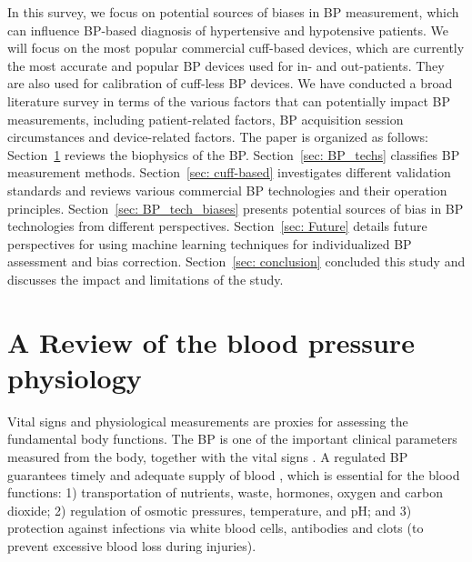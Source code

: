 \documentclass[journal,article,moreauthors]{Definitions/mdpi}
\begin{document}
In this survey, we focus on potential sources of biases in BP measurement, which can influence BP-based diagnosis of hypertensive and hypotensive patients. %
We will focus on the most popular commercial cuff-based devices, which are currently the most accurate and popular BP devices used for in- and out-patients. They are also used for calibration of cuff-less BP devices. We have conducted a broad literature survey in terms of the various factors that can potentially impact BP measurements, including patient-related factors, BP acquisition session circumstances and device-related factors. The paper is organized as follows: Section~\ref{sec: BP_review} reviews the biophysics of the BP. Section~\ref{sec: BP_techs} classifies BP measurement methods. Section~\ref{sec: cuff-based} investigates different validation standards and reviews various commercial BP technologies and their operation principles. 
Section~\ref{sec: BP_tech_biases} presents potential sources of bias in BP technologies from different perspectives. Section~\ref{sec: Future} details future perspectives for using machine learning techniques for individualized BP assessment and bias correction. Section~\ref{sec: conclusion} concluded this study and discusses the impact and limitations of the study.

\section{A Review of the blood pressure physiology}
\label{sec: BP_review}
Vital signs and physiological measurements are proxies for assessing the fundamental body functions. The BP is one of the important clinical parameters measured from the body, together with the vital signs \citep{Magder2018-vy}. A regulated BP guarantees timely and adequate supply of blood \citep{M9}, which is essential for the blood functions: 1) transportation of nutrients, waste, hormones, oxygen and carbon dioxide; 2) regulation of osmotic pressures, temperature, and pH; and 3) protection against infections via white blood cells, antibodies and clots (to prevent excessive blood loss during injuries).
\end{document}
